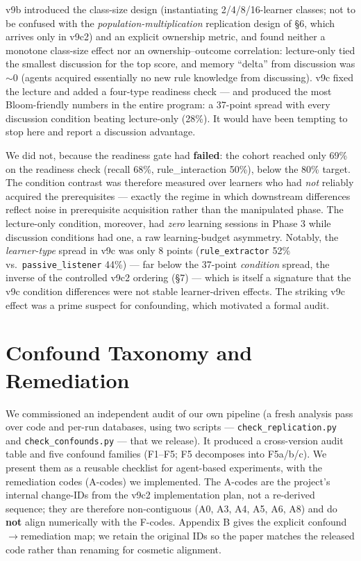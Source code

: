 \documentclass[11pt]{article}
\begin{document}
v9b introduced the class-size design (instantiating 2/4/8/16-learner classes; not
to be confused with the \emph{population-multiplication} replication design of
\S6, which arrives only in v9c2) and an explicit ownership metric, and found neither a
monotone class-size effect nor an ownership--outcome correlation: lecture-only tied
the smallest discussion for the top score, and memory ``delta'' from discussion was
$\sim$0 (agents acquired essentially no new rule knowledge from discussing).  v9c
fixed the lecture and added a four-type readiness check --- and produced the most
Bloom-friendly numbers in the entire program: a 37-point spread with every discussion
condition beating lecture-only (28\%).  It would have been tempting to stop here and
report a discussion advantage.

We did not, because the readiness gate had \textbf{failed}: the cohort reached only
69\% on the readiness check (recall 68\%, rule\_interaction 50\%), below the 80\%
target.  The condition contrast was therefore measured over learners who had \emph{not}
reliably acquired the prerequisites --- exactly the regime in which downstream
differences reflect noise in prerequisite acquisition rather than the manipulated
phase.  The lecture-only condition, moreover, had \emph{zero} learning sessions in
Phase 3 while discussion conditions had one, a raw learning-budget asymmetry.
Notably, the \emph{learner-type} spread in v9c was only 8 points
(\texttt{rule\_extractor} 52\% vs.\ \texttt{passive\_listener} 44\%) --- far below
the 37-point \emph{condition} spread, the inverse of the controlled v9c2 ordering
(\S7) --- which is itself a signature that the v9c condition differences were not
stable learner-driven effects.  The striking v9c effect was a prime suspect for
confounding, which motivated a formal audit.

\section{Confound Taxonomy and Remediation}

We commissioned an independent audit of our own pipeline (a fresh analysis pass over
code and per-run databases, using two scripts --- \texttt{check\_replication.py} and
\texttt{check\_confounds.py} --- that we release).  It produced a cross-version audit
table and five confound families (F1--F5; F5 decomposes into F5a/b/c).  We present
them as a reusable checklist for agent-based experiments, with the remediation codes
(A-codes) we implemented.  The A-codes are the project's internal change-IDs from the
v9c2 implementation plan, not a re-derived sequence; they are therefore
non-contiguous (A0, A3, A4, A5, A6, A8) and do \textbf{not} align numerically with
the F-codes.  Appendix B gives the explicit confound$\to$remediation map; we retain
the original IDs so the paper matches the released code rather than renaming for
cosmetic alignment.
\end{document}
